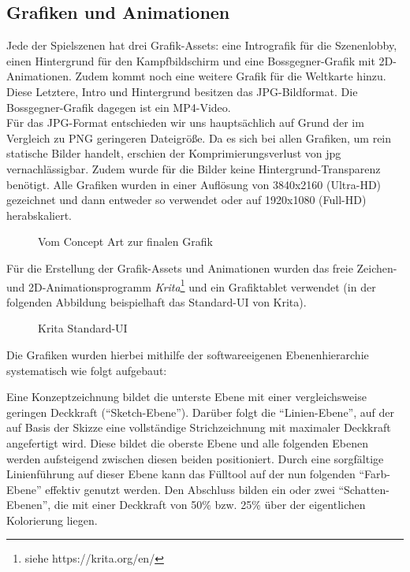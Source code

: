 

\subsection{Grafiken und Animationen}
Jede der Spielszenen hat drei Grafik-Assets: eine Intrografik für die Szenenlobby, einen Hintergrund für den Kampfbildschirm und eine Bossgegner-Grafik mit 2D-Animationen. Zudem kommt noch eine weitere Grafik für die Weltkarte hinzu. Diese Letztere, Intro und Hintergrund besitzen das JPG-Bildformat. Die Bossgegner-Grafik dagegen ist ein MP4-Video.
\\Für das JPG-Format entschieden wir uns hauptsächlich auf Grund der im Vergleich zu PNG geringeren Dateigröße. Da es sich bei allen Grafiken, um rein statische Bilder handelt, erschien der Komprimierungsverlust von jpg vernachlässigbar. Zudem wurde für die Bilder keine Hintergrund-Transparenz benötigt.
Alle Grafiken wurden in einer Auflösung von 3840x2160 (Ultra-HD) gezeichnet und dann entweder so verwendet oder auf 1920x1080 (Full-HD) herabskaliert.

\begin{figure}[H]
    \centering
     \label{fig:mine_exterior_concept}
     \caption{Vom Concept Art zur finalen Grafik}
  \end{figure}

Für die Erstellung der Grafik-Assets und Animationen wurden das freie Zeichen- und 2D-Animationsprogramm \textit{Krita}\footnote{siehe https://krita.org/en/} und ein Grafiktablet verwendet (in der folgenden Abbildung beispielhaft das Standard-UI von Krita).   

\begin{figure}[H]
    \centering
    \caption{Krita Standard-UI}
    \label{fig:krita_ui_example}
\end{figure}

Die Grafiken wurden hierbei mithilfe der softwareeigenen Ebenenhierarchie systematisch wie folgt aufgebaut: 

Eine Konzeptzeichnung bildet die unterste Ebene mit einer vergleichsweise geringen Deckkraft (\enquote{Sketch-Ebene}). Darüber folgt die \enquote{Linien-Ebene}, auf der auf Basis der Skizze eine vollständige Strichzeichnung mit maximaler Deckkraft angefertigt wird. Diese bildet die oberste Ebene und alle folgenden Ebenen werden aufsteigend zwischen diesen beiden positioniert. Durch eine sorgfältige Linienführung auf dieser Ebene kann das Fülltool auf der nun folgenden \enquote{Farb-Ebene} effektiv genutzt werden. Den Abschluss bilden ein oder zwei \enquote{Schatten-Ebenen}, die mit einer Deckkraft von 50\% bzw. 25\% über der eigentlichen Kolorierung liegen. 

